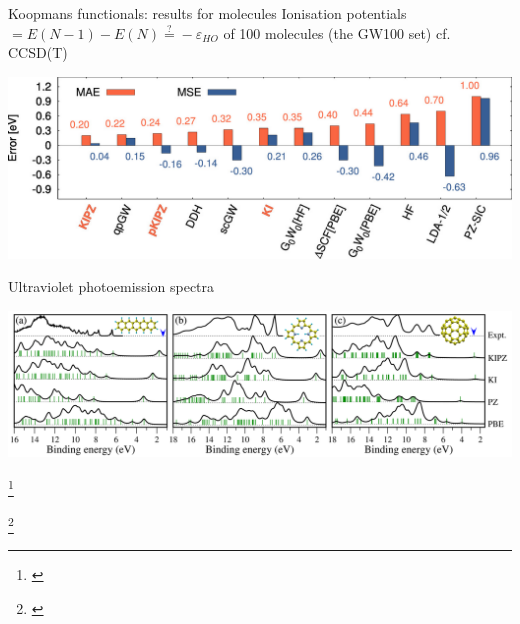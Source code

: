 \documentclass[xcolor=table,aspectratio=169]{beamer}
\newcommand\blfootcite[1]{%
  \begingroup
  \renewcommand\thefootnote{}\footnote{\hspace{-4ex}\cite{#1}}%
  \addtocounter{footnote}{-1}%
  \endgroup
}
\numberwithin{equation}{section}
\begin{document}
\begin{frame}{Koopmans functionals: results for molecules}
   \small
   Ionisation potentials $ = E(N-1) - E(N) \stackrel{?}{=} -\varepsilon_{HO}$ of 100 molecules (the GW100 set) cf. CCSD(T)
   \begin{center}
      \includegraphics[height=0.23\textwidth]{figures/colonna_2019_gw100_ip}
   \end{center}

   \vspace{-3ex}
   Ultraviolet photoemission spectra
   \begin{center}
      \includegraphics[height=0.4\textheight]{figures/fig_nguyen_prl_spectra.png}
   \end{center}
   \blfootcite{Nguyen2015}

   \blfootcite{Colonna2018,vanSetten2015}
\end{frame}

% 
% 
% 
\end{document}
